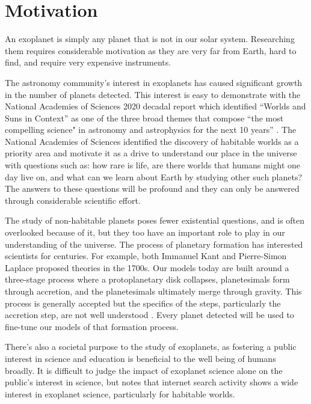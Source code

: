 \section{Motivation}
\label{sec:motivation}

An exoplanet is simply any planet that is not in our solar system. Researching
them requires considerable motivation as they are very far from Earth,
hard to find, and require very expensive instruments. 

The astronomy community's interest in exoplanets has caused significant growth
in the number of planets detected. This interest is easy to demonstrate with
the National Academies of Sciences 2020 decadal report which identified
``Worlds and Suns in Context'' as one of the three broad themes that compose
``the most compelling science" in astronomy and astrophysics for the next 10
years'' \citep{nationalacademiesofsciencesPathwaysDiscoveryAstronomy2021}. The
National Academies of Sciences identified the discovery of habitable worlds as
a priority area and motivate it as a drive to understand our place in the
universe with questions such as: how rare is life, are there worlds that humans
might one day live on, and what can we learn about Earth by studying other such
planets? The answers to these questions will be profound and they can only be
answered through considerable scientific effort.

The study of non-habitable planets poses fewer existential questions, and is
often overlooked because of it, but they too have an important role to play in
our understanding of the universe. The process of planetary formation has
interested scientists for centuries. For example, both Immanuel Kant and
Pierre-Simon Laplace proposed theories \citep{Perryman2018a} in the 1700s. Our
models today are built around a three-stage process where a protoplanetary disk
collapses, planetesimals form through accretion, and the planetesimals
ultimately merge through gravity\citep{Jeffery}. This process is generally
accepted but the specifics of the steps, particularly the accretion step, are
not well understood \citep{Perryman2018a}. Every planet detected will be used
to fine-tune our models of that formation process.

There's also a societal purpose to the study of exoplanets, as fostering a
public interest in science and education is beneficial to the well being of
humans broadly. It is difficult to judge the impact of exoplanet science alone
on the public's interest in science, but \citet{deegImpactExoplanet2018} notes
that internet search activity shows a wide interest in exoplanet science,
particularly for habitable worlds.

